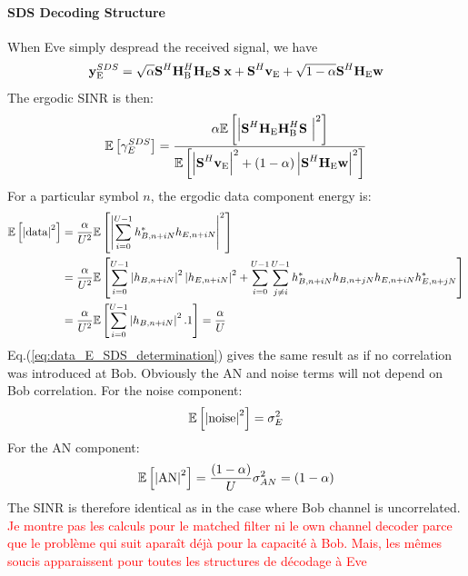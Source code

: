 \documentclass[12pt]{article}
\begin{document}
\paragraph*{SDS Decoding Structure}
When Eve simply despread the received signal, we have
\begin{equation}
\textbf{y}_{\text{E}}^{SDS} = \sqrt{\alpha}\textbf{S}^H  \textbf{H}_{\text{B}}^H \textbf{H}_{\text{E}} \textbf{S}\; \textbf{x} +  \textbf{S}^H \textbf{v}_\text{E} + \sqrt{1-\alpha} \textbf{S}^H \textbf{H}_{\text{E}}\textbf{w}
\label{eq:rx_SDS_eve}
\end{equation}
The ergodic SINR is then:
\begin{equation}
\mathbb{E} \left[\gamma_E^{SDS}\right] = \frac{\alpha\mathbb{E} \left[\left| \textbf{S}^H  \textbf{H}_{\text{E}}\textbf{H}_{\text{B}}^H\textbf{S}\ \right|^2\right]}{ \mathbb{E} \left[\left|  \textbf{S}^H \textbf{v}_\text{E}\right|^2 + (1-\alpha)  \left| \textbf{S}^H  \textbf{H}_{\text{E}} \textbf{w} \right|^2 \right]} \\
\label{eq:expected_sinr_SDS_e}
\end{equation}
For a particular symbol $n$, the ergodic data component energy is:
\begin{equation}
\begin{split}
\mathbb{E} \left[\left| \text{data}\right|^2\right] &=  \frac{\alpha}{U^2} \mathbb{E} \left[\left|\sum_{i=0}^{U-1} h^*_{B,n+iN}h_{E,n+iN}\right|^2\right] \\
&=  \frac{\alpha}{U^2} \mathbb{E} \left[\sum_{i=0}^{U-1} \left|h_{B,n+iN}\right|^2 \left|h_{E,n+iN}\right|^2 + \sum_{i=0}^{U-1}\sum_{j \neq i}^{U-1} h^*_{B,n+iN}  h_{B,n+jN} h_{E,n+iN}  h^*_{E,n+jN} \right] \\
&= \frac{\alpha}{U^2} \mathbb{E} \left[\sum_{i=0}^{U-1} \left|h_{B,n+iN}\right|^2 .1\right] = \frac{\alpha}{U}
\label{eq:data_E_SDS_determination}
\end{split}
\end{equation}
Eq.(\ref{eq:data_E_SDS_determination}) gives the same result as if no correlation was introduced at Bob. Obviously the AN and noise terms will not depend on Bob correlation. 
For the noise component: 
\begin{equation}
\mathbb{E} \left[\left| \text{noise}\right|^2\right] = \sigma^2_{E}
\label{eq:noise_e_SDS_determination}
\end{equation}
For the AN component:
\begin{equation}
\mathbb{E} \left[\left| \text{AN}\right|^2\right] = \frac{(1-\alpha)}{U} \sigma_{AN}^2 = (1-\alpha)
\label{eq:noise_an_SDS_determination}
\end{equation}
The SINR is therefore identical as in the case where Bob channel is uncorrelated.\\

\textcolor{red}{Je montre pas les calculs pour le matched filter ni le own channel decoder parce que le problème qui suit aparaît déjà pour la capacité à Bob. Mais, les mêmes soucis apparaissent pour toutes les structures de décodage à Eve}
\end{document}
